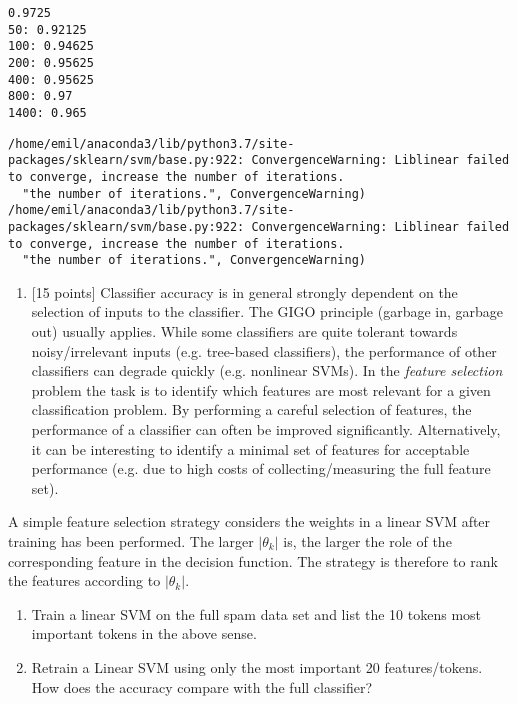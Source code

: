 \documentclass[11pt]{article}
\providecommand{\tightlist}{%
      \setlength{\itemsep}{0pt}\setlength{\parskip}{0pt}}
\begin{document}
    \begin{Verbatim}[commandchars=\\\{\}]
0.9725
50: 0.92125
100: 0.94625
200: 0.95625
400: 0.95625
800: 0.97
1400: 0.965

    \end{Verbatim}

    \begin{Verbatim}[commandchars=\\\{\}]
/home/emil/anaconda3/lib/python3.7/site-packages/sklearn/svm/base.py:922: ConvergenceWarning: Liblinear failed to converge, increase the number of iterations.
  "the number of iterations.", ConvergenceWarning)
/home/emil/anaconda3/lib/python3.7/site-packages/sklearn/svm/base.py:922: ConvergenceWarning: Liblinear failed to converge, increase the number of iterations.
  "the number of iterations.", ConvergenceWarning)

    \end{Verbatim}

    \begin{enumerate}
\def\labelenumi{\alph{enumi})}
\setcounter{enumi}{1}
\tightlist
\item
  {[}15 points{]} Classifier accuracy is in general strongly dependent
  on the selection of inputs to the classifier. The GIGO principle
  (garbage in, garbage out) usually applies. While some classifiers are
  quite tolerant towards noisy/irrelevant inputs (e.g. tree-based
  classifiers), the performance of other classifiers can degrade quickly
  (e.g. nonlinear SVMs). In the \emph{feature selection} problem the
  task is to identify which features are most relevant for a given
  classification problem. By performing a careful selection of features,
  the performance of a classifier can often be improved significantly.
  Alternatively, it can be interesting to identify a minimal set of
  features for acceptable performance (e.g. due to high costs of
  collecting/measuring the full feature set).
\end{enumerate}

A simple feature selection strategy considers the weights in a linear
SVM after training has been performed. The larger \(|\theta_k|\) is, the
larger the role of the corresponding feature in the decision function.
The strategy is therefore to rank the features according to
\(|\theta_k|\).

\begin{enumerate}
\def\labelenumi{\roman{enumi})}
\item
  Train a linear SVM on the full spam data set and list the 10 tokens
  most important tokens in the above sense.
\item
  Retrain a Linear SVM using only the most important 20 features/tokens.
  How does the accuracy compare with the full classifier?
\end{enumerate}
\end{document}
